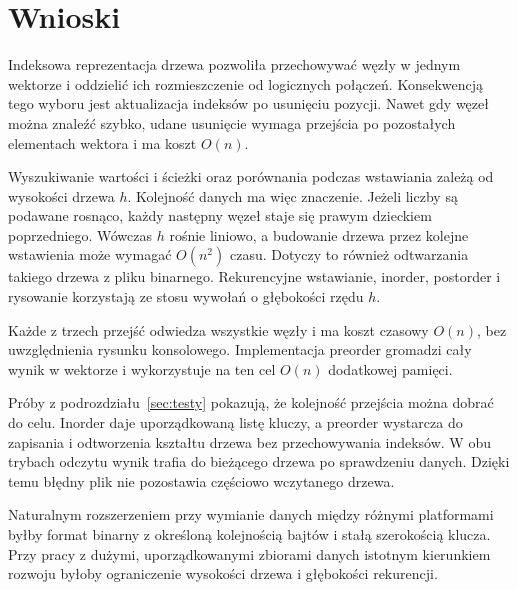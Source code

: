 \clearpage
\section{Wnioski}

Indeksowa reprezentacja drzewa pozwoliła przechowywać węzły
w jednym wektorze i oddzielić ich rozmieszczenie od logicznych
połączeń. Konsekwencją tego wyboru jest aktualizacja indeksów
po usunięciu pozycji. Nawet gdy węzeł można znaleźć szybko,
udane usunięcie wymaga przejścia po pozostałych elementach
wektora i ma koszt $O(n)$.

Wyszukiwanie wartości i ścieżki oraz porównania podczas
wstawiania zależą od wysokości drzewa $h$. Kolejność danych
ma więc znaczenie. Jeżeli liczby są podawane rosnąco, każdy
następny węzeł staje się prawym dzieckiem poprzedniego.
Wówczas $h$ rośnie liniowo, a budowanie drzewa przez kolejne
wstawienia może wymagać $O(n^2)$ czasu. Dotyczy to również
odtwarzania takiego drzewa z pliku binarnego. Rekurencyjne
wstawianie, inorder, postorder i rysowanie korzystają
ze stosu wywołań o głębokości rzędu $h$.

Każde z trzech przejść odwiedza wszystkie węzły i ma koszt
czasowy $O(n)$, bez uwzględnienia rysunku konsolowego.
Implementacja preorder gromadzi cały wynik w wektorze
i wykorzystuje na ten cel $O(n)$ dodatkowej pamięci.

Próby z podrozdziału~\ref{sec:testy} pokazują, że kolejność
przejścia można dobrać do celu. Inorder daje uporządkowaną
listę kluczy, a preorder wystarcza do zapisania i odtworzenia
kształtu drzewa bez przechowywania indeksów. W obu trybach
odczytu wynik trafia do bieżącego drzewa po sprawdzeniu
danych. Dzięki temu błędny plik nie pozostawia częściowo
wczytanego drzewa.

Naturalnym rozszerzeniem przy wymianie danych między różnymi
platformami byłby format binarny z określoną kolejnością
bajtów i stałą szerokością klucza. Przy pracy z dużymi,
uporządkowanymi zbiorami danych istotnym kierunkiem rozwoju
byłoby ograniczenie wysokości drzewa i głębokości rekurencji.
